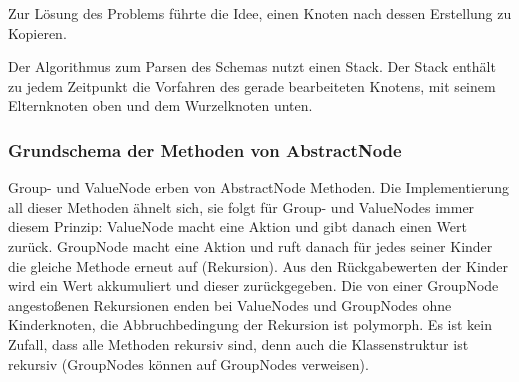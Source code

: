Zur Lösung des Problems führte die Idee, einen Knoten nach dessen Erstellung zu Kopieren.

Der Algorithmus zum Parsen des Schemas nutzt einen Stack. Der Stack enthält zu jedem Zeitpunkt die Vorfahren des gerade bearbeiteten Knotens, mit seinem Elternknoten oben und dem Wurzelknoten unten.



\subsubsection{Grundschema der Methoden von AbstractNode}
\label{sec:RekursiveMethoden}
Group- und ValueNode erben von AbstractNode Methoden. Die Implementierung all dieser Methoden ähnelt sich, sie folgt für Group- und ValueNodes immer diesem Prinzip:
ValueNode macht eine Aktion und gibt danach einen Wert zurück.
GroupNode macht eine Aktion und ruft danach für jedes seiner Kinder die gleiche Methode erneut auf (Rekursion). Aus den Rückgabewerten der Kinder wird ein Wert akkumuliert und dieser zurückgegeben.
Die von einer GroupNode angestoßenen Rekursionen enden bei ValueNodes und GroupNodes ohne Kinderknoten, die Abbruchbedingung der Rekursion ist polymorph.
Es ist kein Zufall, dass alle Methoden rekursiv sind, denn auch die Klassenstruktur ist rekursiv (GroupNodes können auf GroupNodes verweisen).












